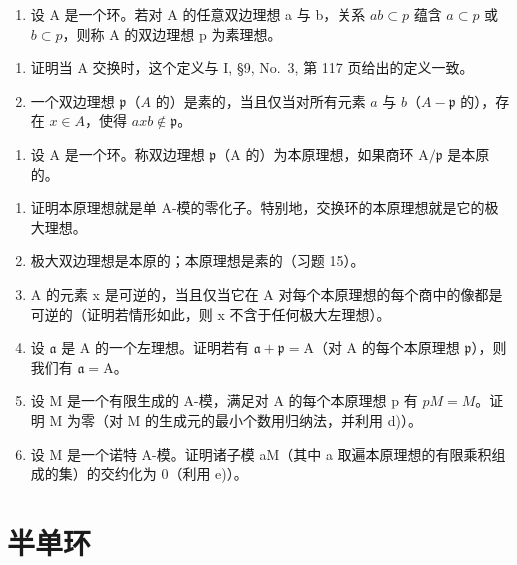 \begin{enumerate}
\def\labelenumi{\arabic{enumi})}
\setcounter{enumi}{14}
\tightlist
\item
  设 A 是一个环。若对 A 的任意双边理想 a 与 b，关系 \(ab \subset p\) 蕴含 \(a \subset p\) 或 \(b \subset p\)，则称 A 的双边理想 p 为素理想。
\end{enumerate}

\begin{enumerate}
\def\labelenumi{\alph{enumi})}
\item
  证明当 A 交换时，这个定义与 I, §9, No.~3, 第 117 页给出的定义一致。
\item
  一个双边理想 \(\mathfrak{p}\)（\(A\) 的）是素的，当且仅当对所有元素 \(a\) 与 \(b\)（\(A - \mathfrak{p}\) 的），存在 \(x \in A\)，使得 \(axb \notin \mathfrak{p}\)。
\end{enumerate}

\begin{enumerate}
\def\labelenumi{\arabic{enumi})}
\setcounter{enumi}{15}
\tightlist
\item
  设 \(\mathrm{A}\) 是一个环。称双边理想 \(\mathfrak{p}\)（\(\mathrm{A}\) 的）为本原理想，如果商环 \(\mathrm{A} / \mathfrak{p}\) 是本原的。
\end{enumerate}

\begin{enumerate}
\def\labelenumi{\alph{enumi})}
\item
  证明本原理想就是单 A-模的零化子。特别地，交换环的本原理想就是它的极大理想。
\item
  极大双边理想是本原的；本原理想是素的（习题 15）。
\item
  A 的元素 x 是可逆的，当且仅当它在 A 对每个本原理想的每个商中的像都是可逆的（证明若情形如此，则 x 不含于任何极大左理想）。
\item
  设 \(\mathfrak{a}\) 是 A 的一个左理想。证明若有 \(\mathfrak{a} + \mathfrak{p} = \mathrm{A}\)（对 A 的每个本原理想 \(\mathfrak{p}\)），则我们有 \(\mathfrak{a} = \mathrm{A}\)。
\item
  设 M 是一个有限生成的 A-模，满足对 A 的每个本原理想 p 有 \(pM = M\)。证明 M 为零（对 M 的生成元的最小个数用归纳法，并利用 d)）。
\item
  设 M 是一个诺特 A-模。证明诸子模 aM（其中 a 取遍本原理想的有限乘积组成的集）的交约化为 0（利用 e)）。
\end{enumerate}

\section{半单环}

